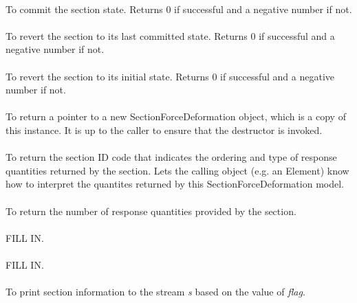  \\
To commit the section state.  Returns $0$ if successful and a negative
number if not. \\

 \\
To revert the section to its last committed state.  Returns $0$ if
successful and a negative number if not. \\

 \\
To revert the section to its initial state. Returns $0$ if successful
and a negative number if not. \\

 \\
To return a pointer to a new SectionForceDeformation object, which is a copy 
of this instance. It is up to the caller to ensure that the destructor is invoked. \\

 \\
To return the section ID code that indicates the ordering and type of
response quantities returned by the section. Lets the calling object
(e.g. an Element) know how to interpret the quantites returned by this
SectionForceDeformation model. \\

 \\
To return the number of response quantities provided by the section. \\

\\
FILL IN. \\

\\
FILL IN. \\

 \\
To print section information to the stream {\em s} based on the value of {\em flag}. \\
